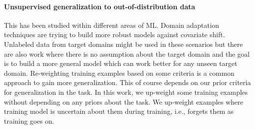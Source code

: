 \paragraph{Unsupervised generalization to out-of-distribution data}
This has been studied within different areas of ML. 
Domain adaptation techniques are trying to build more robust models against covariate shift.
Unlabeled data from target domains might be used in these scenarios but there are also work 
where there is no assumption about the target domain and the goal is to build a more general model which can work better for any unseen target domain. 
Re-weighting training examples based on some criteria is a common approach to gain more generalization.
This of course depends on our prior criteria for generalization in the task.
In this work, we up-weight some training examples without depending on any priors about the task. 
We up-weight examples where training model is uncertain about them during training, i.e., forgets them as training goes on.


